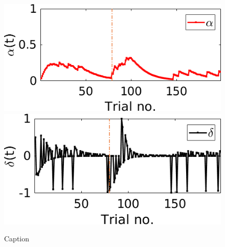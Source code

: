 \begin{figure}
    \centering
    \includegraphics[scale=0.8]{figures/Lastrev1_V05_An6Alpha.png}
    \includegraphics[scale=0.8]{figures/Lastrev1_V05_An6Delta.png}
    \caption{Caption}
    \label{fig:RL_alphadelta}
\end{figure}